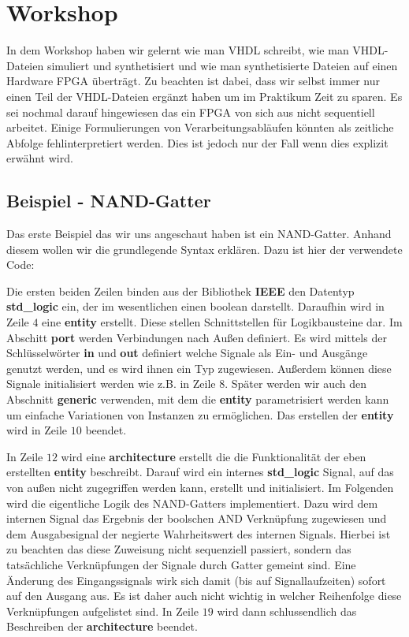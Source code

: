 \section{Workshop}
In dem Workshop haben wir gelernt wie man VHDL schreibt, wie man VHDL-Dateien simuliert und synthetisiert und wie man synthetisierte Dateien auf einen Hardware FPGA überträgt.
Zu beachten ist dabei, dass wir selbst immer nur einen Teil der VHDL-Dateien ergänzt haben um im Praktikum Zeit zu sparen.
Es sei nochmal darauf hingewiesen das ein FPGA von sich aus nicht sequentiell arbeitet.
Einige Formulierungen von Verarbeitungsabläufen könnten als zeitliche Abfolge fehlinterpretiert werden.
Dies ist jedoch nur der Fall wenn dies explizit erwähnt wird.

\subsection{Beispiel - NAND-Gatter}
Das erste Beispiel das wir uns angeschaut haben ist ein NAND-Gatter.
Anhand diesem wollen wir die grundlegende Syntax erklären.
Dazu ist hier der verwendete Code:



Die ersten beiden Zeilen binden aus der Bibliothek \textbf{IEEE} den Datentyp \textbf{std\_logic} ein, der im wesentlichen einen boolean darstellt.
Daraufhin wird in Zeile $4$ eine \textbf{entity} erstellt.
Diese stellen Schnittstellen für Logikbausteine dar.
Im Abschitt \textbf{port} werden Verbindungen nach Außen definiert.
Es wird mittels der Schlüsselwörter \textbf{in} und \textbf{out} definiert welche Signale als Ein- und Ausgänge genutzt werden, und es wird ihnen ein Typ zugewiesen.
Außerdem können diese Signale initialisiert werden wie z.B. in Zeile $8$.
Später werden wir auch den Abschnitt \textbf{generic} verwenden, mit dem die \textbf{entity} parametrisiert werden kann um einfache Variationen von Instanzen zu ermöglichen.
Das erstellen der \textbf{entity} wird in Zeile $10$ beendet.

In Zeile $12$ wird eine \textbf{architecture} erstellt die die Funktionalität der eben erstellten \textbf{entity} beschreibt.
Darauf wird ein internes \textbf{std\_logic} Signal, auf das von außen nicht zugegriffen werden kann, erstellt und initialisiert.
Im Folgenden wird die eigentliche Logik des NAND-Gatters implementiert.
Dazu wird dem internen Signal das Ergebnis der boolschen AND Verknüpfung zugewiesen und dem Ausgabesignal der negierte Wahrheitswert des internen Signals.
Hierbei ist zu beachten das diese Zuweisung nicht sequenziell passiert, sondern das tatsächliche Verknüpfungen der Signale durch Gatter gemeint sind.
Eine Änderung des Eingangssignals wirk sich damit (bis auf Signallaufzeiten) sofort auf den Ausgang aus.
Es ist daher auch nicht wichtig in welcher Reihenfolge diese Verknüpfungen aufgelistet sind.
In Zeile $19$ wird dann schlussendlich das Beschreiben der \textbf{architecture} beendet.

